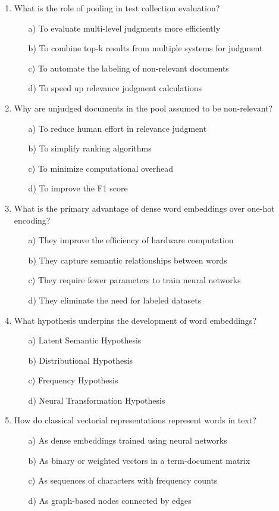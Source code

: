 \documentclass[8pt]{extarticle}
\begin{document}
\begin{multicols}{2}
\begin{enumerate}
\item What is the role of pooling in test collection evaluation?
\begin{itemize}
\item[a)] To evaluate multi-level judgments more efficiently
\item[b)] To combine top-k results from multiple systems for judgment
\item[c)] To automate the labeling of non-relevant documents
\item[d)] To speed up relevance judgment calculations
\end{itemize}

\item Why are unjudged documents in the pool assumed to be non-relevant?
\begin{itemize}
\item[a)] To reduce human effort in relevance judgment
\item[b)] To simplify ranking algorithms
\item[c)] To minimize computational overhead
\item[d)] To improve the F1 score
\end{itemize}

\item What is the primary advantage of dense word embeddings over one-hot encoding?
\begin{itemize}
\item[a)] They improve the efficiency of hardware computation
\item[b)] They capture semantic relationships between words
\item[c)] They require fewer parameters to train neural networks
\item[d)] They eliminate the need for labeled datasets
\end{itemize}

\item What hypothesis underpins the development of word embeddings?
\begin{itemize}
\item[a)] Latent Semantic Hypothesis
\item[b)] Distributional Hypothesis
\item[c)] Frequency Hypothesis
\item[d)] Neural Transformation Hypothesis
\end{itemize}

\item How do classical vectorial representations represent words in text?
\begin{itemize}
\item[a)] As dense embeddings trained using neural networks
\item[b)] As binary or weighted vectors in a term-document matrix
\item[c)] As sequences of characters with frequency counts
\item[d)] As graph-based nodes connected by edges
\end{itemize}


\end{enumerate}
\end{multicols}
\end{document}
